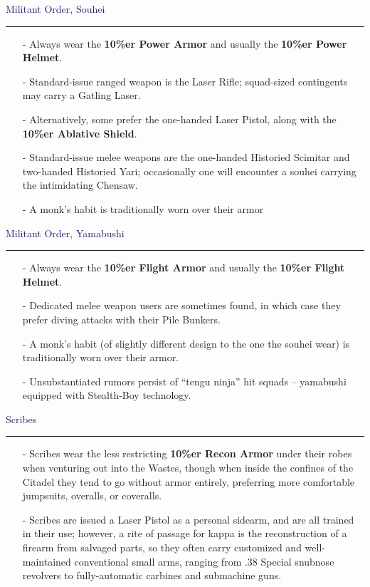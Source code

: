 \documentclass[a4paper,12pt]{book}
\newcommand{\factionheading}[1]{
\parbox{\textwidth}{
        \vspace{2mm}
        \noindent
        \textcolor{MidnightBlue}{
{\large {#1}
        \vspace*{1mm}
        \hrule}
        \vspace*{3mm}
        \noindent
} } }
\begin{document}
\factionheading{Militant Order, Souhei}
\begin{itemize}
\item[-] Always wear the \textbf{10\%er Power Armor} and usually the \textbf{10\%er Power Helmet}.
\item[-] Standard-issue ranged weapon is the Laser Rifle; squad-sized contingents may carry a Gatling Laser.
\item[-] Alternatively, some prefer the one-handed Laser Pistol, along with the \textbf{10\%er Ablative Shield}.
\item[-] Standard-issue melee weapons are the one-handed Historied Scimitar and two-handed Historied Yari; occasionally one will encounter a souhei carrying the intimidating Chensaw.
\item[-] A monk's habit is traditionally worn over their armor
\end{itemize}


\factionheading{Militant Order, Yamabushi}
\begin{itemize}
\item[-] Always wear the \textbf{10\%er Flight Armor} and usually the \textbf{10\%er Flight Helmet}.
\item[-] Dedicated melee weapon users are sometimes found, in which case they prefer diving attacks with their Pile Bunkers.
\item[-] A monk's habit (of slightly different design to the one the souhei wear) is traditionally worn over their armor.
\item[-] Unsubstantiated rumors persist of ``tengu ninja'' hit squads -- yamabushi equipped with Stealth-Boy technology.
\end{itemize}


\factionheading{Scribes}
\begin{itemize}
\item[-] Scribes wear the less restricting \textbf{10\%er Recon Armor} under their robes when venturing out into the Wastes, though when inside the confines of the Citadel they tend to go without armor entirely, preferring more comfortable jumpsuits, overalls, or coveralls.
\item[-] Scribes are issued a Laser Pistol as a personal sidearm, and are all trained in their use; however, a rite of passage for kappa is the reconstruction of a firearm from salvaged parts, so they often carry customized and well-maintained conventional small arms, ranging from .38 Special snubnose revolvers to fully-automatic carbines and submachine guns.
\end{itemize}
\end{document}
